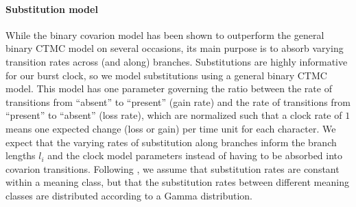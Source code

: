 \documentclass[]{rsos}%
\begin{document}
\paragraph{Substitution model}

While the binary covarion model has been shown to outperform the general binary CTMC
model on several occasions, its main purpose is to absorb varying transition
rates across (and along) branches. Substitutions are highly informative for our burst clock,
so we model substitutions using a general binary CTMC model.
This model has one parameter governing the ratio 
between the rate of transitions from “absent” to “present” (gain rate)
and the rate of transitions from “present” to “absent” (loss rate),
which are normalized such that a clock rate of $1$ means one expected
change (loss or gain) per time unit for each character.
We expect that the varying
rates of substitution along branches inform the branch lengths $l_i$
and the clock model parameters instead of having to be absorbed into covarion transitions.
Following \textcite{maurits2017beastling}, we assume that substitution rates are constant within a
meaning class, but that the substitution rates between different meaning classes
are distributed according to a Gamma distribution.
\end{document}
